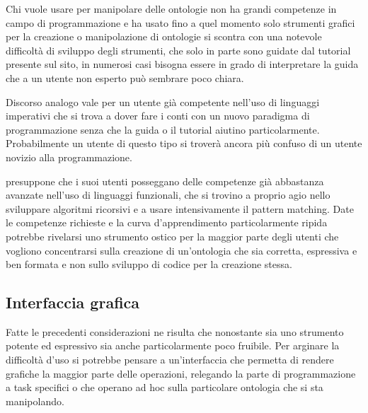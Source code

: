 Chi vuole usare \cduce per manipolare delle ontologie non ha grandi competenze in campo di programmazione e ha usato fino a quel momento solo strumenti grafici per la creazione o manipolazione di ontologie si scontra con una notevole difficoltà di sviluppo degli strumenti, che solo in parte sono guidate dal tutorial presente sul sito, in numerosi casi bisogna essere in grado di interpretare la guida che a un utente non esperto può sembrare poco chiara.

Discorso analogo vale per un utente già competente nell'uso di linguaggi imperativi che si trova a dover fare i conti con un nuovo paradigma di programmazione senza che la guida o il tutorial aiutino particolarmente. Probabilmente un utente di questo tipo si troverà ancora più confuso di un utente novizio alla programmazione.

\cduce presuppone che i suoi utenti posseggano delle competenze già abbastanza avanzate nell'uso di linguaggi funzionali, che si trovino a proprio agio nello sviluppare algoritmi ricorsivi e a usare intensivamente il pattern matching. Date le competenze richieste e la curva d'apprendimento particolarmente ripida \cduce potrebbe rivelarsi uno strumento ostico per la maggior parte degli utenti che vogliono concentrarsi sulla creazione di un'ontologia che sia corretta, espressiva e ben formata e non sullo sviluppo di codice per la creazione stessa.

\subsection{Interfaccia grafica}\label{ch5.4}
Fatte le precedenti considerazioni ne risulta che nonostante \cduce sia uno strumento potente ed espressivo sia anche particolarmente poco fruibile. Per arginare la difficoltà d'uso si potrebbe pensare a un'interfaccia che permetta di rendere grafiche la maggior parte delle operazioni, relegando la parte di programmazione a task specifici o che operano ad hoc sulla particolare ontologia che si sta manipolando.

